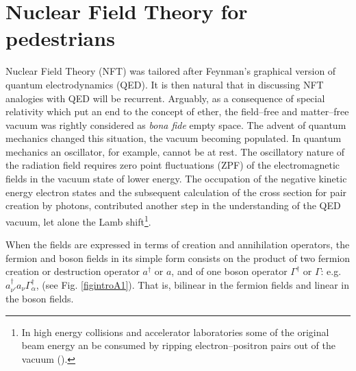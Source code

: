 \section{Nuclear Field Theory for pedestrians}\label{appintroA}

Nuclear Field Theory (NFT) was tailored after Feynman's graphical version of quantum electrodynamics (QED). It is then natural that in discussing NFT analogies with QED will be recurrent.   Arguably, as a consequence of special relativity which put an end to the concept of ether, the field--free and matter--free vacuum was rightly considered as \textit{bona fide} empty space. The advent of quantum mechanics changed this situation, the vacuum becoming populated. In quantum mechanics an oscillator, for example, cannot be at rest. The oscillatory nature of the radiation field requires zero point fluctuations (ZPF) of the electromagnetic fields in the vacuum state of lower energy. The occupation of the negative kinetic energy electron states and the subsequent calculation of the cross section for pair creation by photons, contributed another step in the understanding of the QED vacuum, let alone the Lamb shift\footnote{In high energy collisions and accelerator laboratories some of the original beam energy an be consumed by ripping electron--positron pairs out of the vacuum (\cite{Bruce:07}).}.


When the fields are expressed in terms of creation and annihilation operators, the fermion and boson fields in its simple form consists on the product of two fermion creation or destruction operator $a^\dagger$ or $a$, and of one boson operator $\Gamma^\dagger$ or $\Gamma$: e.g. $a^\dagger_{\nu'}a_\nu\Gamma_\alpha^\dagger$, (see Fig. \ref{figintroA1}). That is,  bilinear in the fermion fields and linear in the boson fields.

